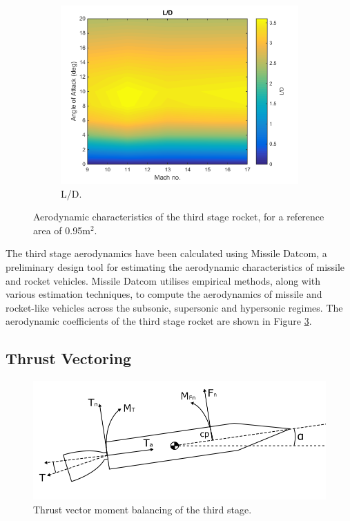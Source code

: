\begin{figure}[ht]
\begin{subfigure}{.5\textwidth}
					\label{fig:Cd-ThirdStage}
				\end{subfigure}
				\begin{subfigure}{.5\textwidth}
					\centering
					\includegraphics[width=0.99\linewidth]{figures/3_vehicle_design/ThirdStageLD}
					\caption{L/D.}
					\label{fig:LD-ThirdStage}
				\end{subfigure}
				\caption{Aerodynamic characteristics of the third stage rocket, for a reference area of 0.95m$^2$.}
				\label{fig:ThirdStageAero}
			\end{figure}
		The third stage aerodynamics have been calculated using Missile Datcom\cite{Rosema2011}, a preliminary design tool for estimating the aerodynamic characteristics of missile and rocket vehicles. Missile Datcom utilises empirical methods, along with various estimation techniques, to compute the aerodynamics of missile and rocket-like vehicles across the subsonic, supersonic and hypersonic regimes. The aerodynamic coefficients of the third stage rocket are shown in Figure \ref{fig:ThirdStageAero}. 
		
		
	
		
		
		
		\subsection{Thrust Vectoring}\label{sec:thrustvectoring}
		\begin{figure}[ht]
			\centering
			\includegraphics[width=0.7\linewidth]{figures/3_vehicle_design/ThrustVec}
			\caption{Thrust vector moment balancing of the third stage.}
			\label{fig:ThrustVec}
		\end{figure}
		
